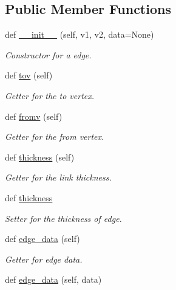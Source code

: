 \subsection*{Public Member Functions}
\begin{DoxyCompactItemize}
\item 
def \mbox{\hyperlink{classbridges_1_1edge_1_1_edge_a3c5cbf52efec4e42a242bbcee7bc8051}{\+\_\+\+\_\+init\+\_\+\+\_\+}} (self, v1, v2, data=None)
\begin{DoxyCompactList}\small\item\em Constructor for a edge. \end{DoxyCompactList}\item 
def \mbox{\hyperlink{classbridges_1_1edge_1_1_edge_a70e81381eaa6abafd0c40962326351a9}{tov}} (self)
\begin{DoxyCompactList}\small\item\em Getter for the to vertex. \end{DoxyCompactList}\item 
def \mbox{\hyperlink{classbridges_1_1edge_1_1_edge_a63bf9365bcaa4e07d687b845b1d6f9f2}{fromv}} (self)
\begin{DoxyCompactList}\small\item\em Getter for the from vertex. \end{DoxyCompactList}\item 
def \mbox{\hyperlink{classbridges_1_1edge_1_1_edge_a1155b5f604410cd46a81902bb8aa348b}{thickness}} (self)
\begin{DoxyCompactList}\small\item\em Getter for the link thickness. \end{DoxyCompactList}\item 
def \mbox{\hyperlink{classbridges_1_1edge_1_1_edge_a3137a2498d08d998471efde3bc1db1b4}{thickness}}
\begin{DoxyCompactList}\small\item\em Setter for the thickness of edge. \end{DoxyCompactList}\item 
def \mbox{\hyperlink{classbridges_1_1edge_1_1_edge_abc3f52467d38ad2d7e06113d0c714ed6}{edge\+\_\+data}} (self)
\begin{DoxyCompactList}\small\item\em Getter for edge data. \end{DoxyCompactList}\item 
def \mbox{\hyperlink{classbridges_1_1edge_1_1_edge_a7429980b52d754159629c73c316cbc41}{edge\+\_\+data}} (self, data)

\end{DoxyCompactItemize}
